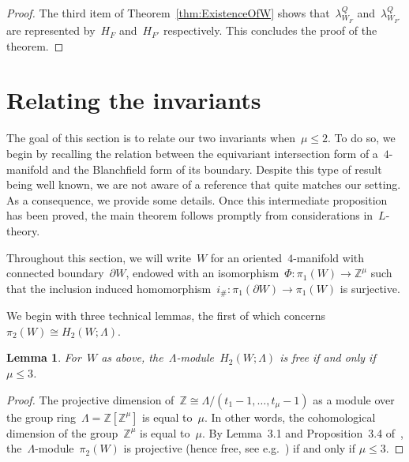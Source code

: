 \documentclass[10.9pt,a4paper]{amsart}
\newtheorem{lemma}[theorem]{Lemma}
\theoremstyle{definition}
\theoremstyle{remark}
\newcommand{\Z}{\mathbb{Z}}
\begin{document}
\begin{proof}
The third item of Theorem~\ref{thm:ExistenceOfW} shows that~$\lambda_{W_F}^Q$ and~$\lambda_{W_{F'}}^Q$ are represented by~$H_F$ and~$H_{F'}$ respectively.
This concludes the proof of the theorem.
\end{proof}




\color{black}

\section{Relating the invariants}
\label{sec:Relating}

The goal of this section is to relate our two invariants when~$\mu\le 2$.
To do so, we begin by recalling the relation between the equivariant intersection form of a~$4$-manifold and the Blanchfield form of its boundary.
Despite this type of result being well known, we are not aware of a reference that quite matches our setting. 
As a consequence, we provide some details.
Once this intermediate proposition has been proved,  the main theorem follows promptly from considerations in~$L$-theory.

\medbreak

Throughout this section, we will write~$W$ for an oriented~$4$-manifold with connected boundary~$\partial W$, endowed with an isomorphism~$\Phi\colon\pi_1(W)\to\Z^\mu$ such that
the inclusion induced homomorphism~$i_\#\colon\pi_1(\partial W)\to\pi_1(W)$ is surjective.


We begin with three technical lemmas, the first of which concerns~$\pi_2(W) \cong H_2(W;\Lambda)$.

\begin{lemma}
\label{lem:H_2IsFree}
For~$W$ as above, the~$\Lambda$-module~$H_2(W;\Lambda)$ is free if and only if $\mu \leq 3$.
\end{lemma}
\begin{proof}
The projective dimension of~$\Z\cong\Lambda/(t_1-1,\ldots,t_\mu-1)$ as a module over
the group ring~$\Lambda=\Z[\Z^\mu]$ is equal to~$\mu$. In other words, the cohomological dimension of the group~$\Z^\mu$
is equal to~$\mu$. 
By Lemma~3.1 and Proposition~3.4 of~\cite{CK},  the~$\Lambda$-module~$\pi_2(W)$ is projective (hence free, see e.g.~\cite[Chapter V,Corollary 4.12]{Lam06}) if and only if $\mu \leq 3$.
\end{proof}
\end{document}
